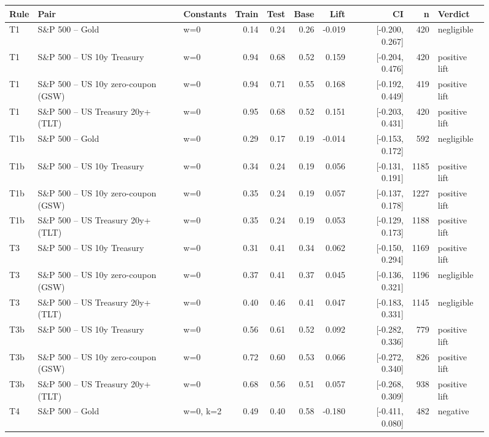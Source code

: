 \begin{figure}
\centering
\begin{tabular}{lllrrrrrrl}
\toprule
Rule & Pair & Constants & Train & Test & Base & Lift & CI & n & Verdict \\
\midrule
T1 & S\&P 500 -- Gold & w=0 & 0.14 & 0.24 & 0.26 & -0.019 & [-0.200, 0.267] & 420 & negligible \\
T1 & S\&P 500 -- US 10y Treasury & w=0 & 0.94 & 0.68 & 0.52 & 0.159 & [-0.204, 0.476] & 420 & positive lift \\
T1 & S\&P 500 -- US 10y zero-coupon (GSW) & w=0 & 0.94 & 0.71 & 0.55 & 0.168 & [-0.192, 0.449] & 419 & positive lift \\
T1 & S\&P 500 -- US Treasury 20y+ (TLT) & w=0 & 0.95 & 0.68 & 0.52 & 0.151 & [-0.203, 0.431] & 420 & positive lift \\
T1b & S\&P 500 -- Gold & w=0 & 0.29 & 0.17 & 0.19 & -0.014 & [-0.153, 0.172] & 592 & negligible \\
T1b & S\&P 500 -- US 10y Treasury & w=0 & 0.34 & 0.24 & 0.19 & 0.056 & [-0.131, 0.191] & 1185 & positive lift \\
T1b & S\&P 500 -- US 10y zero-coupon (GSW) & w=0 & 0.35 & 0.24 & 0.19 & 0.057 & [-0.137, 0.178] & 1227 & positive lift \\
T1b & S\&P 500 -- US Treasury 20y+ (TLT) & w=0 & 0.35 & 0.24 & 0.19 & 0.053 & [-0.129, 0.173] & 1188 & positive lift \\
T3 & S\&P 500 -- US 10y Treasury & w=0 & 0.31 & 0.41 & 0.34 & 0.062 & [-0.150, 0.294] & 1169 & positive lift \\
T3 & S\&P 500 -- US 10y zero-coupon (GSW) & w=0 & 0.37 & 0.41 & 0.37 & 0.045 & [-0.136, 0.321] & 1196 & negligible \\
T3 & S\&P 500 -- US Treasury 20y+ (TLT) & w=0 & 0.40 & 0.46 & 0.41 & 0.047 & [-0.183, 0.331] & 1145 & negligible \\
T3b & S\&P 500 -- US 10y Treasury & w=0 & 0.56 & 0.61 & 0.52 & 0.092 & [-0.282, 0.336] & 779 & positive lift \\
T3b & S\&P 500 -- US 10y zero-coupon (GSW) & w=0 & 0.72 & 0.60 & 0.53 & 0.066 & [-0.272, 0.340] & 826 & positive lift \\
T3b & S\&P 500 -- US Treasury 20y+ (TLT) & w=0 & 0.68 & 0.56 & 0.51 & 0.057 & [-0.268, 0.309] & 938 & positive lift \\
T4 & S\&P 500 -- Gold & w=0, k=2 & 0.49 & 0.40 & 0.58 & -0.180 & [-0.411, 0.080] & 482 & negative \\

\end{tabular}
\end{figure}

